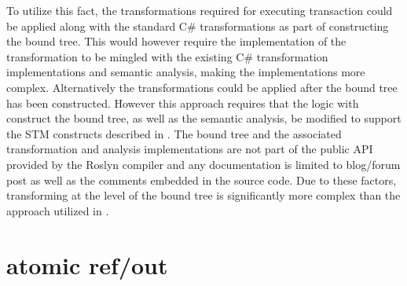 To utilize this fact, the transformations required for executing transaction could be applied along with the standard C\# transformations as part of constructing the bound tree. This would however require the implementation of the transformation to be mingled with the existing C\# transformation implementations and semantic analysis, making the implementations more complex. Alternatively the transformations could be applied after the bound tree has been constructed. However this approach requires that the logic with construct the bound tree, as well as the semantic analysis, be modified to support the \ac{STM} constructs described in . The bound tree and the associated transformation and analysis implementations are not part of the public \ac{API} provided by the Roslyn compiler and any documentation is limited to blog/forum post as well as the comments embedded in the source code. Due to these factors, transforming at the level of the bound tree is significantly more complex than the approach utilized in .
\section{atomic ref/out}
\worksheetend
